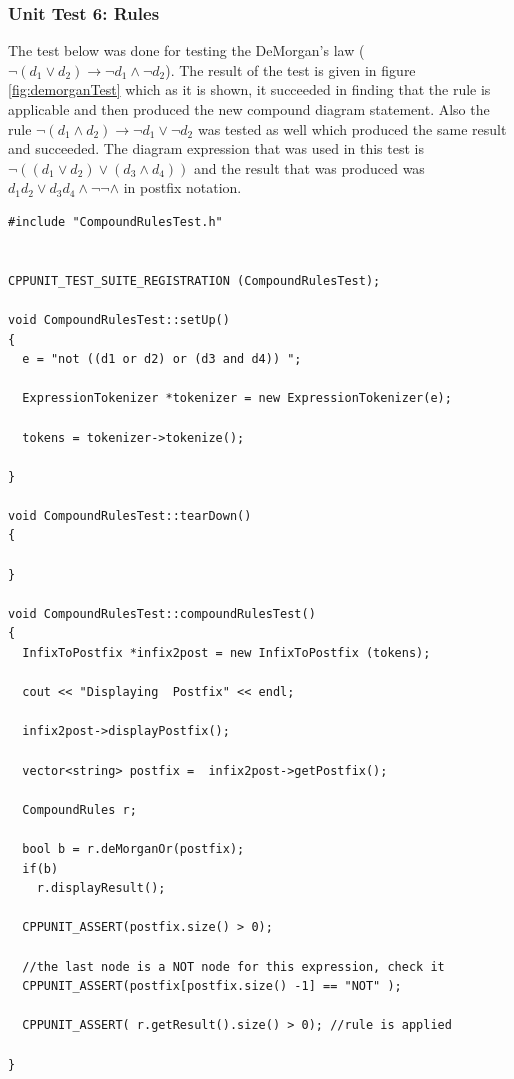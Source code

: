 \documentclass[10pt, a4paper, titlepage]{article}
\begin{document}
\subsubsection{Unit Test 6: Rules}
The test below was done for testing the DeMorgan's law ($ \neg (d_{1} \vee d_{2}) \rightarrow \neg d_{1} \wedge \neg d_{2} $). The result of the test is given in figure \ref{fig:demorganTest} which as it is shown, it succeeded in finding that the rule is applicable and then produced the new compound diagram statement. Also the rule $ \neg (d_{1} \wedge d_{2}) \rightarrow \neg d_{1} \vee \neg d_{2} $ was tested as well which produced the same result and succeeded. The diagram expression that was used in this test is $ \neg ( (d_{1} \vee d_{2}) \vee (d_{3} \wedge d_{4}) ) $ and the result that was produced was $ d_{1} d_{2} \vee d_{3} d_{4} \wedge \neg \neg \wedge$ in postfix notation.  

\small
\begin{lstlisting}
#include "CompoundRulesTest.h"

         
CPPUNIT_TEST_SUITE_REGISTRATION (CompoundRulesTest);

void CompoundRulesTest::setUp()
{
  e = "not ((d1 or d2) or (d3 and d4)) ";

  ExpressionTokenizer *tokenizer = new ExpressionTokenizer(e);

  tokens = tokenizer->tokenize();

}

void CompoundRulesTest::tearDown()
{
  
}

void CompoundRulesTest::compoundRulesTest()
{
  InfixToPostfix *infix2post = new InfixToPostfix (tokens);

  cout << "Displaying  Postfix" << endl;

  infix2post->displayPostfix();
  
  vector<string> postfix =  infix2post->getPostfix();
  
  CompoundRules r;

  bool b = r.deMorganOr(postfix);
  if(b)
    r.displayResult();

  CPPUNIT_ASSERT(postfix.size() > 0);

  //the last node is a NOT node for this expression, check it
  CPPUNIT_ASSERT(postfix[postfix.size() -1] == "NOT" );
	
  CPPUNIT_ASSERT( r.getResult().size() > 0); //rule is applied

}
\end{lstlisting}
\large
\end{document}
